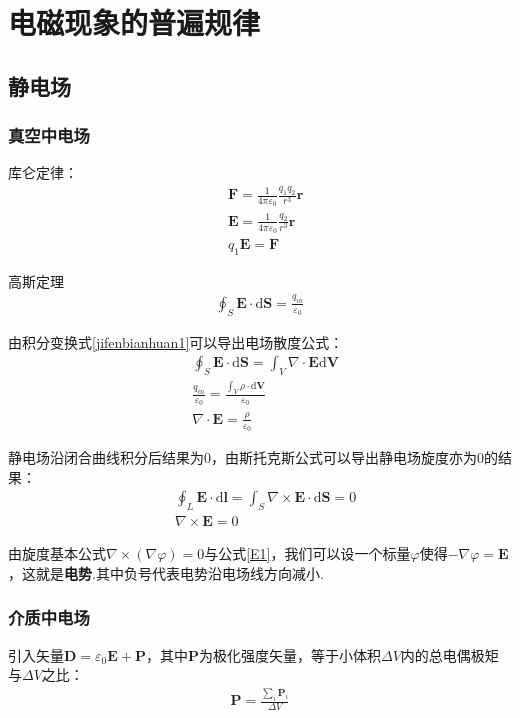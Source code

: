 \documentclass[main.tex]{subfiles}
\begin{document}
\chapter{电磁现象的普遍规律}
\section{静电场}
\subsection{真空中电场}
库仑定律：
\begin{align}
    &\boldsymbol{F} = \frac{1}{4\pi \varepsilon _0} \frac{q_1 q_2}{r^3}\boldsymbol{r}\\
    &\boldsymbol{E} = \frac{1}{4\pi \varepsilon _0} \frac{q_2}{r^3}\boldsymbol{r}\\
    &q_1\boldsymbol{E} = \boldsymbol{F}
\end{align}

高斯定理
\begin{align}
    \oint_{S}^{} \boldsymbol{E}\cdot \mathrm{d}\boldsymbol{S} = \frac{q_{in}}{\varepsilon _0}
\end{align}

由积分变换式\ref{jifenbianhuan1}可以导出电场散度公式：
\begin{align}
    &\oint_{S}^{} \boldsymbol{E}\cdot \mathrm{d}\boldsymbol{S} = \int_{V}^{} \nabla \cdot \boldsymbol{E} \mathrm{d}\boldsymbol{V}\\
    &\frac{q_{in}}{\varepsilon _0} = \frac{\displaystyle \int_{V}^{} \rho \cdot \mathrm{d}\boldsymbol{V}}{\varepsilon _0}\\
    &\nabla \cdot \boldsymbol{E} = \frac{\rho}{\varepsilon _0}
\end{align}

静电场沿闭合曲线积分后结果为0，由斯托克斯公式可以导出静电场旋度亦为0的结果：
\begin{align}
    &\oint_{L}^{} \boldsymbol{E}\cdot \mathrm{d} \boldsymbol{l} = \int_{S}^{} \nabla \times \boldsymbol{E} \cdot \mathrm{d} \boldsymbol{S} = 0\\
    \label{E1}&\nabla \times \boldsymbol{E} = 0
\end{align}

由旋度基本公式$\nabla \times (\nabla \varphi) = 0$与公式\ref{E1}，我们可以设一个标量$\varphi$使得$-\nabla \varphi = \boldsymbol{E}$，这就是\textbf{电势}.其中负号代表电势沿电场线方向减小.

\subsection{介质中电场}
引入矢量$\boldsymbol{D} = \varepsilon _0 \boldsymbol{E} + \boldsymbol{P}$，其中$\boldsymbol{P}$为极化强度矢量，等于小体积$\Delta V$内的总电偶极矩与$\Delta V$之比：
\begin{align}
    \boldsymbol{P} = \frac{\displaystyle \sum_{i}^{} \boldsymbol{P}_i}{\Delta V}
\end{align}
\end{document}
